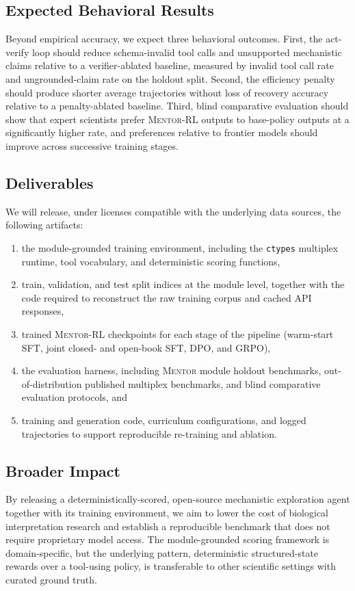 \documentclass[thesis,letterpaper,12pt]{utthesis}
\begin{document}
\subsection{Expected Behavioral Results}
Beyond empirical accuracy, we expect three behavioral outcomes. First, the act-verify loop should reduce schema-invalid tool calls and unsupported mechanistic claims relative to a verifier-ablated baseline, measured by invalid tool call rate and ungrounded-claim rate on the holdout split. Second, the efficiency penalty should produce shorter average trajectories without loss of recovery accuracy relative to a penalty-ablated baseline. Third, blind comparative evaluation should show that expert scientists prefer \textsc{Mentor-RL} outputs to base-policy outputs at a significantly higher rate, and preferences relative to frontier models should improve across successive training stages.

\subsection{Deliverables}
We will release, under licenses compatible with the underlying data sources, the following artifacts:
\begin{enumerate}
    \item the module-grounded training environment, including the \texttt{ctypes} multiplex runtime, tool vocabulary, and deterministic scoring functions,
    \item train, validation, and test split indices at the module level, together with the code required to reconstruct the raw training corpus and cached API responses,
    \item trained \textsc{Mentor-RL} checkpoints for each stage of the pipeline (warm-start SFT, joint closed- and open-book SFT, DPO, and GRPO),
    \item the evaluation harness, including \textsc{Mentor} module holdout benchmarks, out-of-distribution published multiplex benchmarks, and blind comparative evaluation protocols, and
    \item training and generation code, curriculum configurations, and logged trajectories to support reproducible re-training and ablation.
\end{enumerate}

\subsection{Broader Impact}
By releasing a deterministically-scored, open-source mechanistic exploration agent together with its training environment, we aim to lower the cost of biological interpretation research and establish a reproducible benchmark that does not require proprietary model access. The module-grounded scoring framework is domain-specific, but the underlying pattern, deterministic structured-state rewards over a tool-using policy, is transferable to other scientific settings with curated ground truth.
\end{document}
